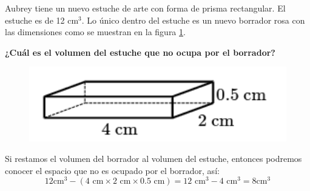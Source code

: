 \question[10] Aubrey tiene un nuevo estuche de arte con forma de prisma rectangular.
El estuche es de 12 cm$^3$. Lo único dentro del estuche es un nuevo borrador rosa con las dimensiones
como se muestran en la figura \ref{fig:vol_area_03}.

\textbf{¿Cuál es el volumen del estuche que no ocupa por el borrador?}\\

\begin{minipage}{0.3\linewidth}
    \begin{figure}[H]
        \begin{center}
            \includegraphics[width=1\textwidth]{../images/vol_area_03}
        \end{center}
        \caption{}
        \label{fig:vol_area_03}
    \end{figure}
\end{minipage}
\begin{minipage}{0.7\linewidth}
    \begin{solutionbox}{3cm}
        Si restamos el volumen del borrador  al volumen del estuche, entonces podremos conocer el espacio que no es ocupado por el borrador, así:
        \[12 \text{cm}^3 - \left(4 \text{ cm} \times 2 \text{ cm} \times 0.5 \text{ cm}\right)=12 \text{ cm}^3 - 4 \text{ cm}^3 = 8 \text{cm}^3   \]
    \end{solutionbox}
\end{minipage}